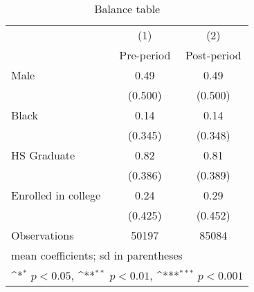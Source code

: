 \begin{table}[htbp]\centering
\def\sym#1{\ifmmode^{#1}\else\(^{#1}\)\fi}
\caption{Balance table}
\begin{tabular}{l*{2}{c}}
\hline\hline
                    &\multicolumn{1}{c}{(1)}&\multicolumn{1}{c}{(2)}\\
                    &\multicolumn{1}{c}{Pre-period}&\multicolumn{1}{c}{Post-period}\\
\hline
Male                &        0.49         &        0.49         \\
                    &     (0.500)         &     (0.500)         \\
[1em]
Black               &        0.14         &        0.14         \\
                    &     (0.345)         &     (0.348)         \\
[1em]
HS Graduate         &        0.82         &        0.81         \\
                    &     (0.386)         &     (0.389)         \\
[1em]
Enrolled in college &        0.24         &        0.29         \\
                    &     (0.425)         &     (0.452)         \\
\hline
Observations        &       50197         &       85084         \\
\hline\hline
\multicolumn{3}{l}{\footnotesize mean coefficients; sd in parentheses}\\
\multicolumn{3}{l}{\footnotesize \sym{*} \(p<0.05\), \sym{**} \(p<0.01\), \sym{***} \(p<0.001\)}\\
\end{tabular}
\end{table}
